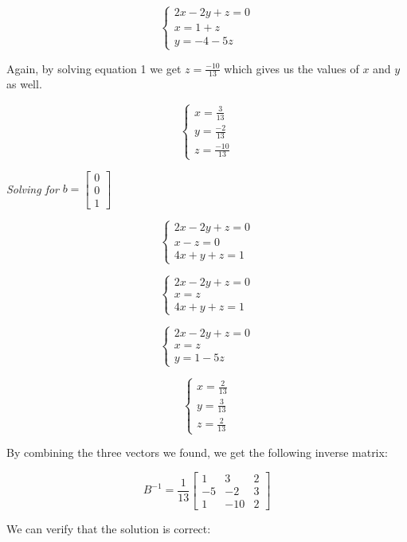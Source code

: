 \documentclass[12pt]{article}
\begin{document}
$$\begin{cases}
  2x - 2y + z = 0 \\
  x = 1 + z \\
  y = -4 -5z
\end{cases}$$

Again, by solving equation 1 we get $z = \frac{-10}{13} $ which gives us the values of $x$ and $y$ as well.

$$\begin{cases}
  x = \frac{3}{13} \\
  y = \frac{-2}{13} \\
  z = \frac{-10}{13}
\end{cases}$$

\textit{Solving for} $b = \begin{bmatrix}
  0 \\
  0 \\
  1
\end{bmatrix}$

$$\begin{cases}
  2x - 2y + z = 0 \\
  x - z = 0 \\
  4x + y + z = 1
\end{cases}$$

$$\begin{cases}
  2x - 2y + z = 0 \\
  x = z \\
  4x + y + z = 1
\end{cases}$$

$$\begin{cases}
  2x - 2y + z = 0 \\
  x = z \\
  y = 1 - 5z
\end{cases}$$

$$\begin{cases}
  x = \frac{2}{13} \\
  y = \frac{3}{13} \\
  z = \frac{2}{13}
\end{cases}$$

By combining the three vectors we found, we get the following inverse matrix:

$$ B^{-1} = \frac{1}{13} \begin{bmatrix}
  1 & 3 & 2 \\
  -5 & -2 & 3 \\
  1 & -10 & 2
\end{bmatrix}$$

We can verify that the solution is correct:
\end{document}
